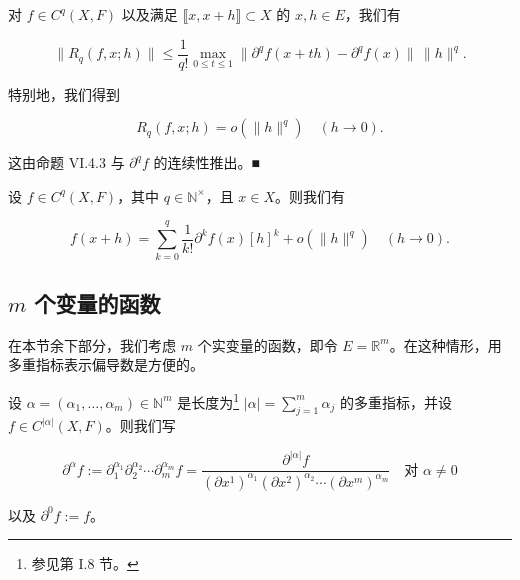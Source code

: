 \begin{remark}

对 $ f \in C^{q}(X, F) $ 以及满足 $ \llbracket x, x + h \rrbracket \subset X $ 的 $ x, h \in E $，我们有

\[
\|R_{q}(f, x; h)\| \le \frac{1}{q!}\max_{0 \le t \le 1}\|\partial^{q}f(x + th) - \partial^{q}f(x)\|\,\|h\|^{q} .
\]

特别地，我们得到

\[
R_{q}(f, x; h) = o(\|h\|^{q}) \quad (h \to 0) .
\]

\proofhead
这由命题 VI.4.3 与 $ \partial^{q}f $ 的连续性推出。\nobreak\hspace{0.35em}■
\end{remark}

\begin{corollary}

设 $ f \in C^{q}(X, F) $，其中 $ q \in \mathbb{N}^{\times} $，且 $ x \in X $。则我们有

\[
f(x + h) = \sum_{k=0}^{q}\frac{1}{k!}\partial^{k}f(x)[h]^{k} + o(\|h\|^{q}) \quad (h \to 0) .
\]
\end{corollary}

\subsection*{$ m $ 个变量的函数}

在本节余下部分，我们考虑 $ m $ 个实变量的函数，即令 $ E = \mathbb{R}^{m} $。在这种情形，用多重指标表示偏导数是方便的。

设 $ \alpha = (\alpha_{1}, \ldots, \alpha_{m}) \in \mathbb{N}^{m} $ 是长度为\footnote{参见第 I.8 节。} $ |\alpha| = \sum_{j=1}^{m}\alpha_{j} $ 的多重指标，并设 $ f \in C^{|\alpha|}(X, F) $。则我们写

\[
\partial^{\alpha}f := \partial_{1}^{\alpha_{1}}\partial_{2}^{\alpha_{2}}\cdots\partial_{m}^{\alpha_{m}}f = \frac{\partial^{|\alpha|}f}{(\partial x^{1})^{\alpha_{1}}(\partial x^{2})^{\alpha_{2}}\cdots(\partial x^{m})^{\alpha_{m}}} \quad \text{对 } \alpha \ne 0
\]

以及 $ \partial^{0}f := f $。

